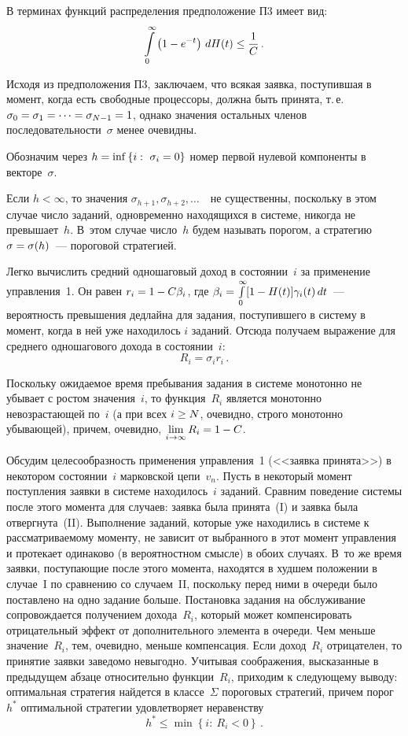 \begin{multicols}{2}
  В терминах функций распределения предположение П3 имеет вид:
  $$
  \int\limits_0^\infty \left(1-e^{-t}\right)\,dH(t) \leq \displaystyle\frac{\displaystyle 1\mathstrut}{\displaystyle C\mathstrut}\,.
  $$
  
  \smallskip
  
  Исходя из предположения П3, заключаем, что всякая заявка, поступившая в момент, 
когда есть свободные процессоры, должна быть принята, т.\,е.\ $\sigma_0\hm=\sigma_1 
=\cdots = \sigma_{N-1}\hm=1$, однако значения остальных членов 
последовательности~$\sigma$ менее очевидны.
  
  Обозначим через $h\hm=\mathrm{inf}\,\{i:\ \sigma_i=0\}$ номер первой нулевой 
компоненты в векторе~$\sigma$.
  
  Если $h<\infty$, то значения $\sigma_{h+1},\sigma_{h+2},\ldots$\ \ не существенны, 
поскольку в этом случае число заданий, одновременно находящихся в системе, никогда не 
превышает~$h$. В~этом случае число~$h$ будем называть порогом, а стратегию 
$\sigma\hm=\sigma(h)$~--- пороговой стратегией.
  
  Легко вычислить средний одношаговый доход в состоянии~$i$ за применение 
управления~1. Он равен $r_i\hm=1\hm-C\beta_i$, где $\beta_i\hm= \int\limits_0^\infty [1\hm-
H(t)]\gamma_i(t)\,dt$~--- вероятность превышения дедлайна для задания, поступившего в 
систему в момент, когда в ней уже находилось $i$ заданий. Отсюда получаем выражение 
для среднего одношагового дохода в состоянии~$i$:
  \begin{equation}
  R_i=\sigma_i r_i\,.
  \label{e6-kon}
  \end{equation}
  
  Поскольку ожидаемое время пребывания задания в системе монотонно не убывает с 
ростом значения~$i$, то функция~$R_i$ является монотонно невозрастающей по~$i$ (а 
при всех $i\hm\geq N$, очевидно, строго монотонно убывающей), причем, очевидно, 
$\lim\limits_{i\to\infty} R_i\hm= 1-\hm C$.
  
  Обсудим целесообразность применения управ\-ле\-ния~1 (<<заявка принята>>) в 
некотором состоянии~$i$ марковской цепи~$v_n$. Пусть в некоторый момент 
поступления заявки в системе находилось~$i$ заданий. Сравним поведение системы после 
этого момента для случаев: заявка была принята~(I) и заявка была отвергнута~(II). 
Выполнение заданий, которые уже находились в системе к рассматриваемому моменту, не 
зависит от выбранного в этот момент управления и протекает одинаково (в вероятностном 
смысле) в обоих случаях. В~то же время заявки, поступающие после этого момента, 
находятся в худшем положении в случае~I по сравнению со случаем~II, поскольку перед 
ними в очереди было поставлено на одно задание больше. Постановка задания на 
обслуживание сопровождается получением дохода~$R_i$, который может 
компенсировать отрицательный эффект от дополнительного элемента в очереди. Чем 
меньше значение~$R_i$, тем, очевидно, меньше компенсация. Если доход~$R_i$ 
отрицателен, то принятие заявки заведомо невыгодно. Учитывая соображения, 
высказанные в предыдущем абзаце относительно функции~$R_i$, приходим к 
сле\-ду\-юще\-му выводу: оптимальная стратегия найдется в классе~$\Sigma$ пороговых 
стратегий, причем порог~$h^*$ оптимальной стратегии удовлетворяет неравенству
  $$
  h^*\leq \min \left\{ i:\ R_i<0\right\}\,.
  $$
  

\end{multicols}
